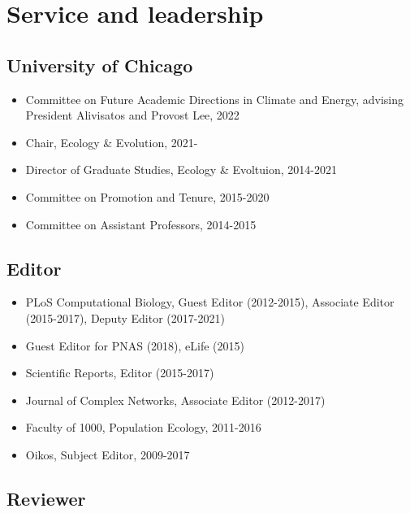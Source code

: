\documentclass[10,letter,]{awesome-cv}
\providecommand{\tightlist}{%
	\setlength{\itemsep}{0pt}\setlength{\parskip}{0pt}}
\begin{document}
\hypertarget{service-and-leadership}{%
\section{Service and leadership}\label{service-and-leadership}}

\hypertarget{university-of-chicago}{%
\subsection{University of Chicago}\label{university-of-chicago}}

\begin{itemize}
\tightlist
\item
  Committee on Future Academic Directions in Climate and Energy,
  advising President Alivisatos and Provost Lee, 2022
\item
  Chair, Ecology \& Evolution, 2021-
\item
  Director of Graduate Studies, Ecology \& Evoltuion, 2014-2021
\item
  Committee on Promotion and Tenure, 2015-2020
\item
  Committee on Assistant Professors, 2014-2015
\end{itemize}

\hypertarget{editor}{%
\subsection{Editor}\label{editor}}

\begin{itemize}
\tightlist
\item
  PLoS Computational Biology, Guest Editor (2012-2015), Associate Editor
  (2015-2017), Deputy Editor (2017-2021)
\item
  Guest Editor for PNAS (2018), eLife (2015)
\item
  Scientific Reports, Editor (2015-2017)
\item
  Journal of Complex Networks, Associate Editor (2012-2017)
\item
  Faculty of 1000, Population Ecology, 2011-2016
\item
  Oikos, Subject Editor, 2009-2017
\end{itemize}

\hypertarget{reviewer}{%
\subsection{Reviewer}\label{reviewer}}
\end{document}
